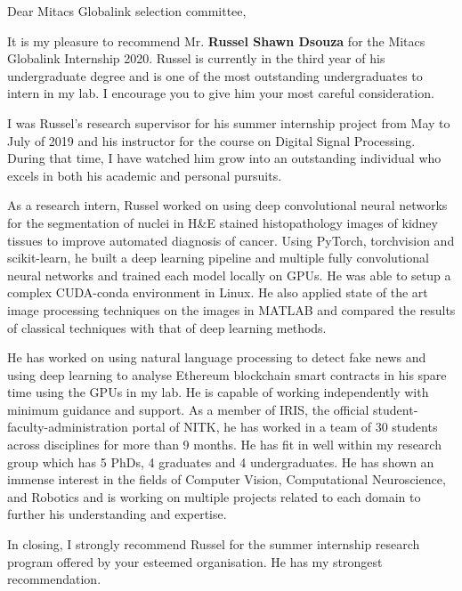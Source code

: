\documentclass[12pt]{article}
\begin{document}
  \noindent
  Dear Mitacs Globalink selection committee,

  \bigskip
  \noindent
  It is my pleasure to recommend Mr. \textbf{Russel Shawn Dsouza} for the Mitacs Globalink Internship 2020. Russel is currently in the third year of his undergraduate degree and is one of the most outstanding undergraduates to intern in my lab. I encourage you to give him your most careful consideration.

  \medskip
  \noindent
  I was Russel's research supervisor for his summer internship project from May to July of 2019 and his instructor for the course on Digital Signal Processing.
  During that time, I have watched him grow into an outstanding individual who excels in both his academic and personal pursuits.

  \medskip
  \noindent
  As a research intern, Russel worked on using deep convolutional neural networks for the segmentation of nuclei in H\&E stained histopathology images of kidney tissues to improve automated diagnosis of cancer.
  Using PyTorch, torchvision and scikit-learn, he built a deep learning pipeline and multiple fully convolutional neural networks and trained each model locally on GPUs. 
  He was able to setup a complex CUDA-conda environment in Linux.
  He also applied state of the art image processing techniques on the images in MATLAB and compared the results of classical techniques with that of deep learning methods.

  \medskip
  \noindent
  He has worked on using natural language processing to detect fake news and using deep learning to analyse Ethereum blockchain smart contracts in his spare time using the GPUs in my lab.
  He is capable of working independently with minimum guidance and support. 
  As a member of IRIS, the official student-faculty-administration portal of NITK, he has worked in a team of 30 students across disciplines for more than 9 months.
  He has fit in well within my research group which has 5 PhDs, 4 graduates and 4 undergraduates.
  He has shown an immense interest in the fields of Computer Vision, Computational Neuroscience, and Robotics and is working on multiple projects related to each domain to further his understanding and expertise.

  \medskip
  \noindent
  In closing, I strongly recommend Russel for the summer internship research program offered by your esteemed organisation. He has my strongest recommendation.
\end{document}
